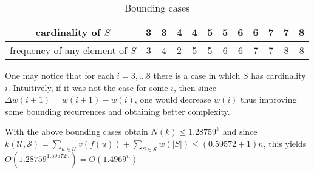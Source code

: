\begin{table}[ht]
    \centering
    \begin{tabular}{c|c|c|c|c|c|c|c|c|c|c|c}
         cardinality of $S$         & 3 & 3 & 4 & 4 & 5 & 5 & 6 & 6 & 7 & 7 & 8\\
         \hline
         frequency of any element of $S$   & 3 & 4 & 2 & 5 & 5 & 6 & 6 & 7 & 7 & 8 & 8\\
    \end{tabular}
    \caption{Bounding cases}
    \label{bounding_cases}
\end{table}
One may notice that for each $i = 3, \dots 8$ there is a case in which $S$ has cardinality $i$. Intuitively, if it was not the case for some $i$, then since $\Delta w(i+1) = w(i+1) - w(i)$, one would decrease $w(i)$ thus improving some bounding recurrences and obtaining better complexity.
\par With the above bounding cases \citeauthor{VANROOIJ20112147} obtain $N(k) \leq 1.28759^k$ and since $k(\mathcal{U}, \mathcal{S}) = \sum_{u \in \mathcal{U}} v(f(u)) + \sum_{S \in \mathcal{S}} w(|S|) \leq (0.59572 + 1) n$, this yields $O(1.28759^{1.59572n}) = O(1.4969^n)$
